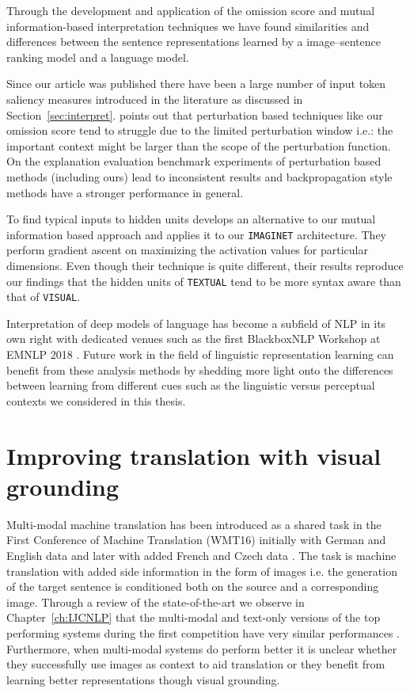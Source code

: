 Through the development and application of the omission score and 
mutual information-based interpretation techniques we have found similarities and differences between
the sentence representations learned by a image--sentence ranking model 
and a language model. 

Since our article was published there have been a large number of input token saliency 
measures introduced in the literature as discussed in Section~\ref{sec:interpret}. 
\cite{shrikumar2017learning}
points out that perturbation based techniques like our omission score tend to struggle
 due to the limited perturbation window i.e.: the
important context might be larger than the scope of the perturbation function. 
On the explanation evaluation benchmark experiments of \cite{poerner2018evaluating} 
perturbation based methods (including ours) lead to inconsistent results and backpropagation style
methods \citep{bach2015pixel,shrikumar2017learning} have a stronger performance in general.

To find typical inputs to hidden units \cite{poerner2018interpretable} develops an alternative
to our mutual information based approach and applies it to our \texttt{IMAGINET} architecture.
They perform gradient ascent on maximizing the activation values for particular dimensions.
Even though their technique is quite different, their results reproduce our findings that the hidden 
units of \texttt{TEXTUAL} tend to be more syntax aware than that of \texttt{VISUAL}.

Interpretation of deep models of language has become a subfield of NLP in its own right
with dedicated venues such as the first BlackboxNLP Workshop at EMNLP 2018
\citep{alishahi2019analyzing}. Future work in the field of linguistic representation learning
can benefit from these analysis methods by shedding more light onto the differences between
learning from different cues such as the linguistic versus perceptual contexts we considered in 
this thesis.



\section{Improving translation with visual grounding}

Multi-modal machine translation has been introduced as a shared task in the
First Conference of Machine Translation (WMT16) \citep{Specia2016} initially with
German and English  \citep{W16-3210} data and
later with added French and Czech data \citep{elliott2017findings}. The task is 
machine translation with added side information in the form of images i.e. the generation of the target sentence 
is conditioned both on the source and a corresponding image.
Through a review of the state-of-the-art we observe in Chapter~\ref{ch:IJCNLP} 
that the multi-modal and text-only versions of 
the top performing systems during the first competition
have very similar performances \citep{Specia2016}. 
Furthermore, when multi-modal systems do perform better it is unclear whether they successfully use images as 
context to aid translation or they benefit from learning better representations though visual grounding.

